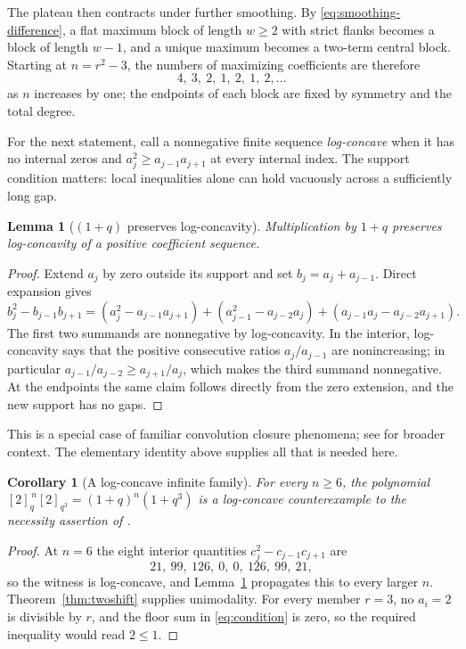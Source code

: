 \documentclass[11pt]{article}
\theoremstyle{research}
\newtheorem{lemma}[theorem]{Lemma}
\newtheorem{corollary}[theorem]{Corollary}
\theoremstyle{definition}
\newcommand{\qi}[1]{[#1]_q}
\newcommand{\qir}[2]{[#1]_{q^{#2}}}
\numberwithin{equation}{section}
\begin{document}
The plateau then contracts under further smoothing. By
\eqref{eq:smoothing-difference}, a flat maximum block of length $w\ge2$
with strict flanks becomes a block of length $w-1$, and a unique maximum
becomes a two-term central block. Starting at $n=r^2-3$, the numbers of
maximizing coefficients are therefore
\begin{equation}\label{eq:plateau-evolution}
 4,\ 3,\ 2,\ 1,\ 2,\ 1,\ 2,\ldots
\end{equation}
as $n$ increases by one; the endpoints of each block are fixed by symmetry
and the total degree.

For the next statement, call a nonnegative finite sequence
\emph{log-concave} when it has no internal zeros and $a_j^2\ge a_{j-1}a_{j+1}$
at every internal index. The support condition matters: local inequalities
alone can hold vacuously across a sufficiently long gap.

\begin{lemma}[$(1+q)$ preserves log-concavity]\label{lem:lc}
Multiplication by $1+q$ preserves log-concavity of a positive coefficient
sequence.
\end{lemma}
\begin{proof}
Extend $a_j$ by zero outside its support and set $b_j=a_j+a_{j-1}$. Direct
expansion gives
\begin{equation}\label{eq:lc-identity}
 b_j^2-b_{j-1}b_{j+1}
  =(a_j^2-a_{j-1}a_{j+1})
   +(a_{j-1}^2-a_{j-2}a_j)
   +(a_{j-1}a_j-a_{j-2}a_{j+1}).
\end{equation}
The first two summands are nonnegative by log-concavity. In the interior,
log-concavity says that the positive consecutive ratios $a_j/a_{j-1}$ are
nonincreasing; in particular $a_{j-1}/a_{j-2}\ge a_{j+1}/a_j$, which makes
the third summand nonnegative. At the endpoints the same claim follows
directly from the zero extension, and the new support has no gaps.
\end{proof}

This is a special case of familiar convolution closure phenomena; see
\cite{Stanley} for broader context. The elementary identity above supplies
all that is needed here.

\begin{corollary}[A log-concave infinite family]\label{cor:infinite}
For every $n\ge6$, the polynomial
$\qi2^{\,n}\qir23=(1+q)^n(1+q^3)$ is a log-concave counterexample to the
necessity assertion of \cite[Conjecture 5.4]{CIMSY}.
\end{corollary}
\begin{proof}
At $n=6$ the eight interior quantities $c_j^2-c_{j-1}c_{j+1}$ are
\begin{equation}\label{eq:lc-witness}
 21,\ 99,\ 126,\ 0,\ 0,\ 126,\ 99,\ 21,
\end{equation}
so the witness is log-concave, and Lemma~\ref{lem:lc} propagates this to
every larger $n$. Theorem~\ref{thm:twoshift} supplies unimodality.
For every member $r=3$, no $a_i=2$ is divisible by $r$, and the floor sum
in \eqref{eq:condition} is zero, so the required inequality would read
$2\le1$.
\end{proof}
\end{document}
